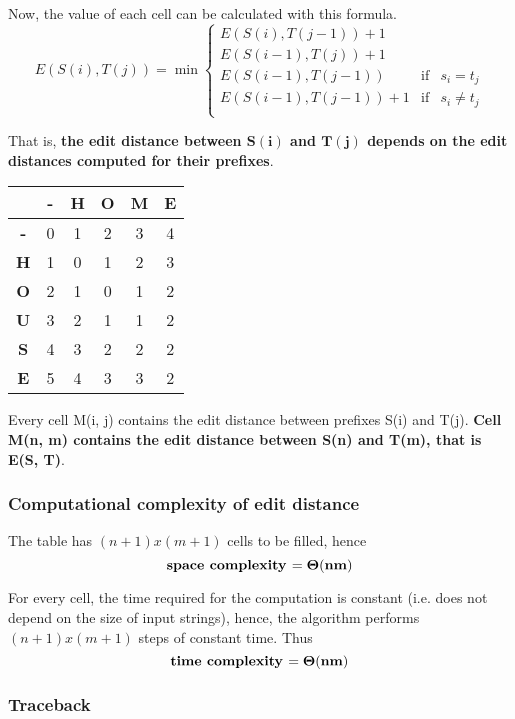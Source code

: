 \documentclass[12pt, letterpaper]{article}
\begin{document}
Now, the value of each cell can be calculated with this formula.
$$
E(S(i), T(j)) = \min \left\{\begin{array}{rcl}
E(S(i), T(j-1)) + 1 \\ 
E(S(i-1), T(j)) + 1 \\
E(S(i-1), T(j-1)) & \mbox{if} & s_i = t_j \\
E(S(i-1), T(j-1)) +1 & \mbox{if} & s_i \neq t_j \\
\end{array}
\right.
$$

That is, \textbf{the edit distance between $\mathbf{S(i)}$ and $\mathbf{T(j)}$ depends on the edit distances computed for their prefixes}.

\begin{center}
\begin{tabular}{|c|c|c|c|c|c|}
\hline
& \textbf{-} & \textbf{H} & \textbf{O} & \textbf{M} & \textbf{E} \\
\hline
\textbf{-} & 0 & 1 & 2 & 3 & 4 \\
\hline
\textbf{H} & 1 & 0 & 1 & 2 & 3 \\
\hline
\textbf{O} & 2 & 1 & 0 & 1 & 2 \\
\hline
\textbf{U} & 3 & 2 & 1 & 1 & 2 \\
\hline
\textbf{S} & 4 & 3 & 2 & 2 & 2 \\
\hline
\textbf{E} & 5 & 4 & 3 & 3 & \cellcolor[gray]{0.9}2 \\
\hline
\end{tabular}
\end{center}

Every cell M(i, j) contains the edit distance between prefixes S(i) and T(j). \textbf{Cell M(n, m) contains the edit distance between S(n) and T(m), that is E(S, T)}.

\subsubsection{Computational complexity of edit distance}

The table has $(n + 1) x (m + 1)$ cells to be filled, hence
$$
\mbox{\textbf{space complexity }} \mathbf{= \Theta(nm)}
$$

For every cell, the time required for the computation is constant (i.e. does not depend on the size of input strings), hence, the algorithm performs $(n+1)x(m+1)$ steps of constant time. Thus
$$
\mbox{\textbf{time complexity }} \mathbf{= \Theta(nm)}
$$

\subsubsection{Traceback}
\end{document}
